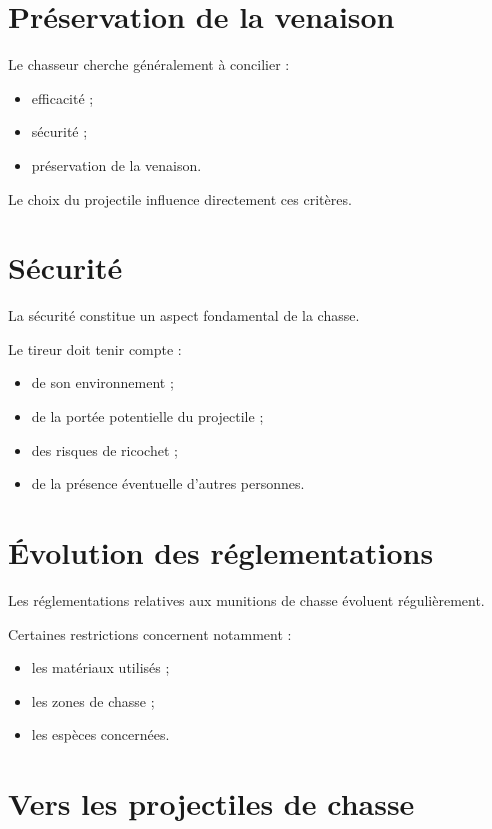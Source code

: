\section{Préservation de la venaison}

Le chasseur cherche généralement à concilier :

\begin{itemize}
    \item efficacité ;
    \item sécurité ;
    \item préservation de la venaison.
\end{itemize}

Le choix du projectile influence directement ces critères.

\section{Sécurité}

La sécurité constitue un aspect fondamental de la chasse.

Le tireur doit tenir compte :

\begin{itemize}
    \item de son environnement ;
    \item de la portée potentielle du projectile ;
    \item des risques de ricochet ;
    \item de la présence éventuelle d'autres personnes.
\end{itemize}

\section{Évolution des réglementations}

Les réglementations relatives aux munitions de chasse évoluent régulièrement.

Certaines restrictions concernent notamment :

\begin{itemize}
    \item les matériaux utilisés ;
    \item les zones de chasse ;
    \item les espèces concernées.
\end{itemize}

\section{Vers les projectiles de chasse}

